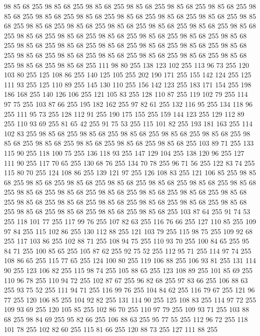 98 85 68 255 98 85 68 255 98 85 68 255 98 85 68 255 98 85 68 255 98 85 68 255 98 85 68 255 98 85 68 255 98 85 68 255 98 85 68 255 98 85 68 255 98 85 68 255 98 85 68 255 98 85 68 255 98 85 68 255 98 85 68 255 98 85 68 255 98 85 68 255 98 85 68 255 98 85 68 255 98 85 68 255 98 85 68 255 98 85 68 255 98 85 68 255 98 85 68 255 98 85 68 255 98 85 68 255 98 85 68 255 98 85 68 255 98 85 68 255 98 85 68 255 98 85 68 255 98 85 68 255 98 85 68 255 98 85 68 255 98 85 68 255 98 85 68 255 98 85 68 255 98 85 68 255 111 98 80 255 138 123 102 255 113 96 73 255 120 103 80 255 125 108 86 255 140 125 105 255 202 190 171 255 155 142 124 255 125 111 93 255 125 110 89 255 145 130 110 255 156 142 123 255 183 171 154 255 198 186 168 255 140 126 106 255 121 105 83 255 128 110 87 255 119 102 79 255 114 97 75 255 103 87 66 255 195 182 162 255 97 82 61 255 132 116 95 255 134 118 96 255 111 95 73 255
128 112 91 255 190 175 155 255 159 144 123 255 129 112 89 255 110 93 69 255 81 65 42 255 91 75 53 255 115 101 82 255 193 181 163 255 114 102 83 255 98 85 68 255 98 85 68 255 98 85 68 255 98 85 68 255 98 85 68 255 98 85 68 255 98 85 68 255 98 85 68 255 98 85 68 255 98 85 68 255 103 89 71 255 133 115 90 255 118 100 75 255 136 118 93 255 147 129 104 255 138 120 96 255 127 111 90 255 117 70 65 255 130 68 76 255 134 70 78 255 96 71 56 255 122 83 74 255 115 80 70 255 124 108 86 255 139 121 97 255 126 108 83 255 121 106 85 255 98 85 68 255 98 85 68 255 98 85 68 255 98 85 68 255 98 85 68 255 98 85 68 255 98 85 68 255 98 85 68 255 98 85 68 255 98 85 68 255 98 85 68 255 98 85 68 255 98 85 68 255 98 85 68 255 98 85 68 255 98 85 68 255 98 85 68 255 98 85 68 255 98 85 68 255 98 85 68 255 98 85 68 255 98 85 68 255 98 85 68 255 103 87 64 255 91 74 53 255 118 101 77 255 117 99 76 255
107 82 63 255 116 76 66 255 127 110 85 255 109 97 84 255 115 102 86 255 130 112 88 255 121 103 79 255 115 98 75 255 109 92 68 255 117 103 86 255 102 88 71 255 108 94 75 255 110 93 70 255 100 84 65 255 95 84 71 255 100 85 65 255 105 87 62 255 92 75 52 255 112 95 71 255 114 97 74 255 108 86 65 255 115 77 65 255 124 100 80 255 119 106 88 255 106 93 81 255 131 114 90 255 123 106 82 255 115 98 74 255 105 88 65 255 123 108 89 255 101 85 69 255 110 96 78 255 110 94 72 255 102 87 67 255 96 82 68 255 97 83 66 255 106 88 63 255 93 75 52 255 111 94 71 255 116 99 76 255 104 84 62 255 116 79 67 255 121 96 77 255 120 106 85 255 104 92 82 255 131 114 90 255 125 108 83 255 114 97 72 255 109 93 69 255 120 105 85 255 102 86 70 255 110 97 79 255 109 93 71 255 103 88 68 255 98 84 69 255 95 82 66 255 106 88 63 255 95 77 55 255 112 96 72 255 118 101 78 255 102 82 60 255 115 81 66 255 120 88 73 255 127 111 88 255
